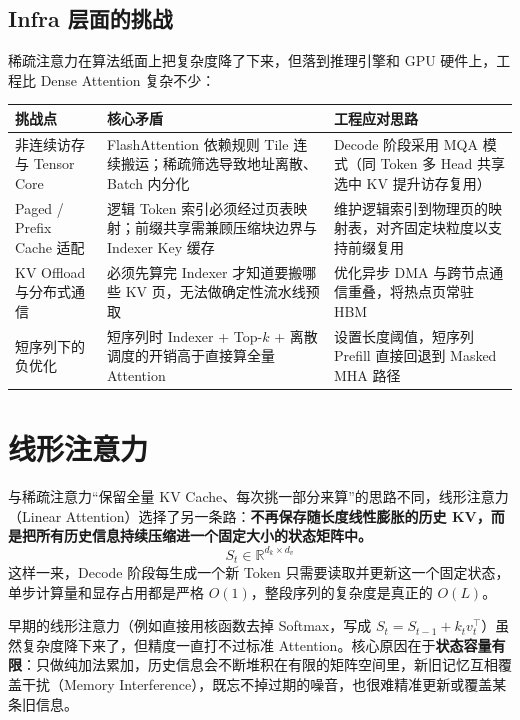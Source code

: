 \documentclass[11pt]{article}
\begin{document}
\subsection{Infra 层面的挑战}

稀疏注意力在算法纸面上把复杂度降了下来，但落到推理引擎和 GPU 硬件上，工程比 Dense Attention 复杂不少：

\begin{table}[htbp]
  \centering
  \small
  \begin{tabular}{p{2.8cm}p{5.8cm}p{6.4cm}}
    \hline
    \textbf{挑战点} & \textbf{核心矛盾} & \textbf{工程应对思路} \\
    \hline
    非连续访存与 Tensor Core & FlashAttention 依赖规则 Tile 连续搬运；稀疏筛选导致地址离散、Batch 内分化 & Decode 阶段采用 MQA 模式（同 Token 多 Head 共享选中 KV 提升访存复用） \\
    \hline
    Paged / Prefix Cache 适配 & 逻辑 Token 索引必须经过页表映射；前缀共享需兼顾压缩块边界与 Indexer Key 缓存 & 维护逻辑索引到物理页的映射表，对齐固定块粒度以支持前缀复用 \\
    \hline
    KV Offload 与分布式通信 & 必须先算完 Indexer 才知道要搬哪些 KV 页，无法做确定性流水线预取 & 优化异步 DMA 与跨节点通信重叠，将热点页常驻 HBM \\
    \hline
    短序列下的负优化 & 短序列时 Indexer + Top-$k$ + 离散调度的开销高于直接算全量 Attention & 设置长度阈值，短序列 Prefill 直接回退到 Masked MHA 路径 \\
    \hline
  \end{tabular}
\end{table}

\section{线形注意力}

与稀疏注意力“保留全量 KV Cache、每次挑一部分来算”的思路不同，线形注意力（Linear Attention）选择了另一条路：\textbf{不再保存随长度线性膨胀的历史 KV，而是把所有历史信息持续压缩进一个固定大小的状态矩阵中。}
\[
  S_t \in \mathbb{R}^{d_k \times d_v}
\]
这样一来，Decode 阶段每生成一个新 Token 只需要读取并更新这一个固定状态，单步计算量和显存占用都是严格 $O(1)$，整段序列的复杂度是真正的 $O(L)$。

早期的线形注意力（例如直接用核函数去掉 Softmax，写成 $S_t = S_{t-1} + k_t v_t^\top$）虽然复杂度降下来了，但精度一直打不过标准 Attention。核心原因在于\textbf{状态容量有限}：只做纯加法累加，历史信息会不断堆积在有限的矩阵空间里，新旧记忆互相覆盖干扰（Memory Interference），既忘不掉过期的噪音，也很难精准更新或覆盖某条旧信息。
\end{document}
